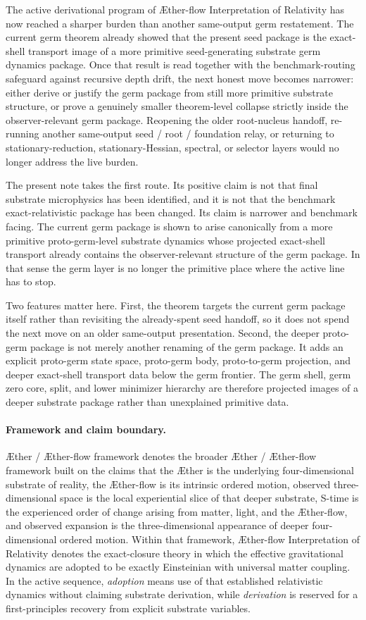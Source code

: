\documentclass[11pt]{article}
\newcommand{\Aether}{\AE{}ther}
\newcommand{\Aflow}{\AE{}ther-flow}
\newcommand{\TheoryName}{\Aflow{} Interpretation of Relativity}
\newcommand{\TheoryProgram}{\Aether{} / \Aflow{} framework}
\begin{document}
The active derivational program of \TheoryName{} has now reached a sharper burden than another same-output germ restatement. The current germ theorem already showed that the present seed package is the exact-shell transport image of a more primitive seed-generating substrate germ dynamics package. Once that result is read together with the benchmark-routing safeguard against recursive depth drift, the next honest move becomes narrower: either derive or justify the germ package from still more primitive substrate structure, or prove a genuinely smaller theorem-level collapse strictly inside the observer-relevant germ package. Reopening the older root-nucleus handoff, re-running another same-output seed / root / foundation relay, or returning to stationary-reduction, stationary-Hessian, spectral, or selector layers would no longer address the live burden.

The present note takes the first route. Its positive claim is not that final substrate microphysics has been identified, and it is not that the benchmark exact-relativistic package has been changed. Its claim is narrower and benchmark facing. The current germ package is shown to arise canonically from a more primitive proto-germ-level substrate dynamics whose projected exact-shell transport already contains the observer-relevant structure of the germ package. In that sense the germ layer is no longer the primitive place where the active line has to stop.

Two features matter here. First, the theorem targets the current germ package itself rather than revisiting the already-spent seed handoff, so it does not spend the next move on an older same-output presentation. Second, the deeper proto-germ package is not merely another renaming of the germ package. It adds an explicit proto-germ state space, proto-germ body, proto-to-germ projection, and deeper exact-shell transport data below the germ frontier. The germ shell, germ zero core, split, and lower minimizer hierarchy are therefore projected images of a deeper substrate package rather than unexplained primitive data.

\paragraph{Framework and claim boundary.}
\TheoryProgram{} denotes the broader \Aether{} / \Aflow{} framework built on the claims that the \Aether{} is the underlying four-dimensional substrate of reality, the \Aflow{} is its intrinsic ordered motion, observed three-dimensional space is the local experiential slice of that deeper substrate, S-time is the experienced order of change arising from matter, light, and the \Aflow{}, and observed expansion is the three-dimensional appearance of deeper four-dimensional ordered motion. Within that framework, \TheoryName{} denotes the exact-closure theory in which the effective gravitational dynamics are adopted to be exactly Einsteinian with universal matter coupling. In the active sequence, \emph{adoption} means use of that established relativistic dynamics without claiming substrate derivation, while \emph{derivation} is reserved for a first-principles recovery from explicit substrate variables.
\end{document}
